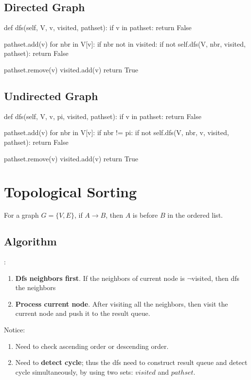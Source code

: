 \subsection{Directed Graph}

\begin{python}
def dfs(self, V, v, visited, pathset):
  if v in pathset:
    return False

  pathset.add(v)
  for nbr in V[v]:
    if nbr not in visited:
      if not self.dfs(V, nbr, visited, pathset):
        return False

  pathset.remove(v)
  visited.add(v)
  return True
\end{python}
\subsection{Undirected Graph}
\begin{python}
def dfs(self, V, v, pi, visited, pathset):
  if v in pathset:
    return False

  pathset.add(v)
  for nbr in V[v]:
    if nbr != pi:
      if not self.dfs(V, nbr, v, visited, pathset):
        return False

  pathset.remove(v)
  visited.add(v)
  return True
\end{python}

\section{Topological Sorting}
For a graph $G=\{V, E\}$, if $A \rightarrow B $, then $A$ is before $B$ in the ordered list. 
\subsection{Algorithm}
:
\begin{enumerate}
\item \textbf{Dfs neighbors first}. If the neighbors of current node is  $\neg$visited, then dfs the neighbors
\item \textbf{Process current node}. After visiting all the neighbors, then visit the current node and push it to the result queue.

\end{enumerate}
Notice:
\begin{enumerate}
\item Need to check ascending order or descending order. 
\item Need to \textbf{detect cycle}; thus the dfs need to construct result queue and detect cycle simultaneously, by using two sets: $visited$ and $pathset$. 
\end{enumerate}

